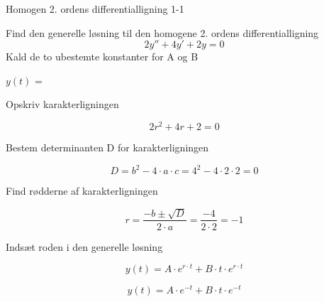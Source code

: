 \documentclass{article}
\begin{document}
\tableofcontents
\newpage


\begin{exercise}{Homogen 2. ordens differentialligning 1-1}

Find den generelle løsning til den homogene 2. ordens differentialligning
\[
2y'' + 4y' + 2y = 0
\]
Kald de to ubestemte konstanter for A og B

$y(t)$ = 


\hint 

Opskriv karakterligningen

\hint

\[
2 r^2 + 4r + 2 = 0
\]


\hint

Bestem determinanten D for karakterligningen


\hint 
\[
D = b^2 - 4 \cdot a \cdot c = 4^2 - 4 \cdot 2 \cdot 2  = 0
\]

\hint 
Find rødderne af karakterligningen


\hint

\[
r = \frac{-b \pm \sqrt{D}}{2 \cdot a} = \frac{-4}{2 \cdot 2} = -1
\]

\hint

Indsæt roden i den generelle løsning

\hint
\[
y(t) = A \cdot e^{r \cdot t} + B \cdot t \cdot e^{r \cdot t}
\]

\hint

\[
y(t) = A \cdot e^{-t} + B \cdot t \cdot e^{-t}
\]


\end{exercise}

\newpage
\end{document}
